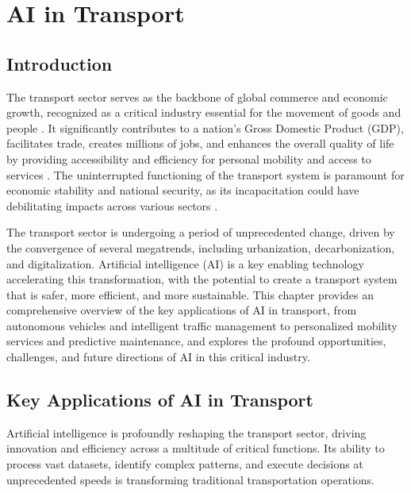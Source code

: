 \chapter{AI in Transport}
\label{cha:ai_in_transport}

\section{Introduction}

The transport sector serves as the backbone of global commerce and economic growth, recognized as a critical industry essential for the movement of goods and people \cite{TransportGeography_Critical}. It significantly contributes to a nation's Gross Domestic Product (GDP), facilitates trade, creates millions of jobs, and enhances the overall quality of life by providing accessibility and efficiency for personal mobility and access to services \cite{KZNTransport_Critical, Britannica_Critical}. The uninterrupted functioning of the transport system is paramount for economic stability and national security, as its incapacitation could have debilitating impacts across various sectors \cite{GAO_Transport}.

The transport sector is undergoing a period of unprecedented change, driven by the convergence of several megatrends, including urbanization, decarbonization, and digitalization. Artificial intelligence (AI) is a key enabling technology accelerating this transformation, with the potential to create a transport system that is safer, more efficient, and more sustainable. This chapter provides an comprehensive overview of the key applications of AI in transport, from autonomous vehicles and intelligent traffic management to personalized mobility services and predictive maintenance, and explores the profound opportunities, challenges, and future directions of AI in this critical industry.

\section{Key Applications of AI in Transport}

Artificial intelligence is profoundly reshaping the transport sector, driving innovation and efficiency across a multitude of critical functions. Its ability to process vast datasets, identify complex patterns, and execute decisions at unprecedented speeds is transforming traditional transportation operations.

